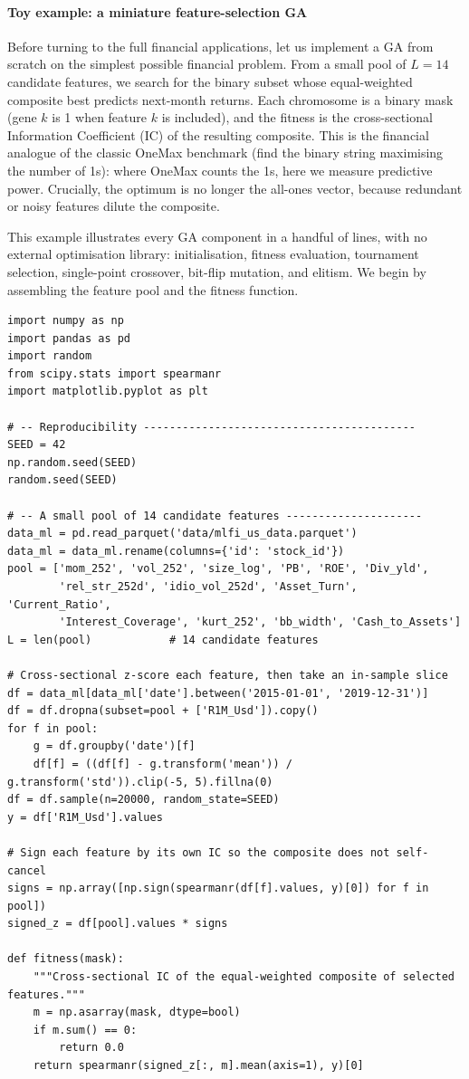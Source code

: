 \paragraph{Toy example: a miniature feature-selection GA}

Before turning to the full financial applications, let us implement a GA from scratch on the simplest possible financial problem. From a small pool of $L = 14$ candidate features, we search for the binary subset whose equal-weighted composite best predicts next-month returns. Each chromosome is a binary mask (gene $k$ is 1 when feature $k$ is included), and the fitness is the cross-sectional Information Coefficient (IC) of the resulting composite. This is the financial analogue of the classic OneMax benchmark (find the binary string maximising the number of 1s): where OneMax counts the 1s, here we measure predictive power. Crucially, the optimum is no longer the all-ones vector, because redundant or noisy features dilute the composite.

This example illustrates every GA component in a handful of lines, with no external optimisation library: initialisation, fitness evaluation, tournament selection, single-point crossover, bit-flip mutation, and elitism. We begin by assembling the feature pool and the fitness function.

\begin{verbatim}
import numpy as np
import pandas as pd
import random
from scipy.stats import spearmanr
import matplotlib.pyplot as plt

# -- Reproducibility ------------------------------------------
SEED = 42
np.random.seed(SEED)
random.seed(SEED)

# -- A small pool of 14 candidate features ---------------------
data_ml = pd.read_parquet('data/mlfi_us_data.parquet')
data_ml = data_ml.rename(columns={'id': 'stock_id'})
pool = ['mom_252', 'vol_252', 'size_log', 'PB', 'ROE', 'Div_yld',
        'rel_str_252d', 'idio_vol_252d', 'Asset_Turn', 'Current_Ratio',
        'Interest_Coverage', 'kurt_252', 'bb_width', 'Cash_to_Assets']
L = len(pool)            # 14 candidate features

# Cross-sectional z-score each feature, then take an in-sample slice
df = data_ml[data_ml['date'].between('2015-01-01', '2019-12-31')]
df = df.dropna(subset=pool + ['R1M_Usd']).copy()
for f in pool:
    g = df.groupby('date')[f]
    df[f] = ((df[f] - g.transform('mean')) / g.transform('std')).clip(-5, 5).fillna(0)
df = df.sample(n=20000, random_state=SEED)
y = df['R1M_Usd'].values

# Sign each feature by its own IC so the composite does not self-cancel
signs = np.array([np.sign(spearmanr(df[f].values, y)[0]) for f in pool])
signed_z = df[pool].values * signs

def fitness(mask):
    """Cross-sectional IC of the equal-weighted composite of selected features."""
    m = np.asarray(mask, dtype=bool)
    if m.sum() == 0:
        return 0.0
    return spearmanr(signed_z[:, m].mean(axis=1), y)[0]
\end{verbatim}


